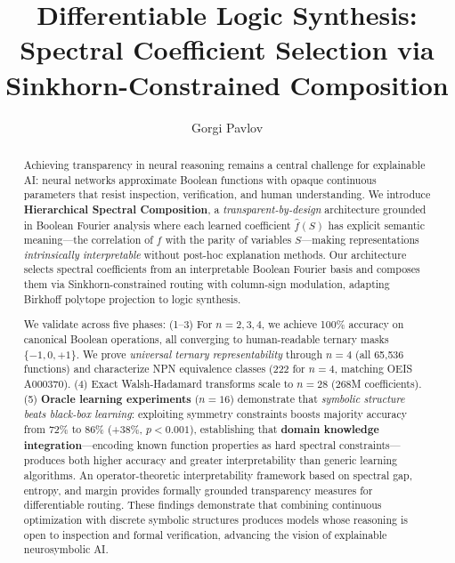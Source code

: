 \documentclass[Royal,times,sageh]{sagej}
\begin{document}

\title{Differentiable Logic Synthesis: Spectral Coefficient Selection via Sinkhorn-Constrained Composition}

\author{Gorgi Pavlov}




\begin{abstract}
Achieving transparency in neural reasoning remains a central challenge for explainable AI: neural networks approximate Boolean functions with opaque continuous parameters that resist inspection, verification, and human understanding. We introduce \textbf{Hierarchical Spectral Composition}, a \textit{transparent-by-design} architecture grounded in Boolean Fourier analysis where each learned coefficient $\hat{f}(S)$ has explicit semantic meaning---the correlation of $f$ with the parity of variables $S$---making representations \textit{intrinsically interpretable} without post-hoc explanation methods. Our architecture selects spectral coefficients from an interpretable Boolean Fourier basis and composes them via Sinkhorn-constrained routing with column-sign modulation, adapting Birkhoff polytope projection to logic synthesis.

We validate across five phases: (1--3) For $n=2,3,4$, we achieve 100\% accuracy on canonical Boolean operations, all converging to human-readable ternary masks $\{-1,0,+1\}$. We prove \textit{universal ternary representability} through $n=4$ (all 65,536 functions) and characterize NPN equivalence classes (222 for $n=4$, matching OEIS A000370). (4) Exact Walsh-Hadamard transforms scale to $n=28$ (268M coefficients). (5) \textbf{Oracle learning experiments} ($n=16$) demonstrate that \textit{symbolic structure beats black-box learning}: exploiting symmetry constraints boosts majority accuracy from 72\% to 86\% (+38\%, $p < 0.001$), establishing that \textbf{domain knowledge integration}---encoding known function properties as hard spectral constraints---produces both higher accuracy and greater interpretability than generic learning algorithms. An operator-theoretic interpretability framework based on spectral gap, entropy, and margin provides formally grounded transparency measures for differentiable routing. These findings demonstrate that combining continuous optimization with discrete symbolic structures produces models whose reasoning is open to inspection and formal verification, advancing the vision of explainable neurosymbolic AI.
\end{abstract}
\end{document}
